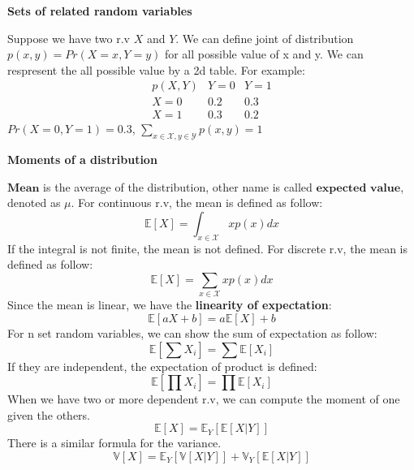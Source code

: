 \documentclass[10pt,landscape]{article}
\newcommand{\mean}{\mathbb{E}}
\newcommand{\var}{\mathbb{V}}
\begin{document}
\begin{multicols*}{3}
\textbf{Sets of related random variables}

    Suppose we have two r.v $X$ and $Y$. We can define joint of distribution $p(x,y)=Pr(X=x,Y=y)$ for all possible value of x and y. We can respresent the all possible value by a 2d table. For example:
    \[
    \begin{array}{c|cc}
        p(X,Y) & Y = 0 & Y = 1 \\
        \hline
        X = 0 & 0.2 & 0.3 \\
        X = 1 & 0.3 & 0.2
    \end{array}
    \]
    $Pr(X=0,Y=1)=0.3$, $\sum_{x \in \mathcal{X},y \in \mathcal{Y}}p(x,y)=1$

\textbf{Moments of a distribution}

    $\textbf{Mean}$ is the average of the distribution, other name is called $\textbf{expected value}$, denoted as $\mu$. For continuous r.v, the mean is defined as follow:
    \begin{equation*}
        \mathbb{E}[X]=\int_{x\in \mathcal{X}}xp(x)dx
    \end{equation*}
    If the integral is not finite, the mean is not defined.
    For discrete r.v, the mean is defined as follow:
    \begin{equation*}
        \mathbb{E}[X]=\sum_{x\in \mathcal{X}}xp(x)dx
    \end{equation*}
    Since the mean is linear, we have the \textbf{linearity of expectation}:
    \begin{equation*}
        \mathbb{E}[aX+b]=a\mathbb{E}[X]+b
    \end{equation*}
    For n set random variables, we can show the sum of expectation as follow:
    \begin{equation*}
        \mathbb{E}[\sum X_i]=\sum \mathbb{E}[X_i]
    \end{equation*}
    If they are independent, the expectation of product is defined:
    \begin{equation*}
        \mathbb{E}[\prod X_i]=\prod \mathbb{E}[X_i]
    \end{equation*}
    When we have two or more dependent r.v, we can compute the moment of one given the others. 
    \begin{equation*}
        \mean[X]=\mean_Y[\mean[X|Y]]
    \end{equation*}
    There is a similar formula for the variance.
    \begin{equation*}
        \var[X]=\mean_Y[\var[X|Y]] +\var_Y[\mean[X|Y]]

\end{equation*}
\end{multicols*}
\end{document}
